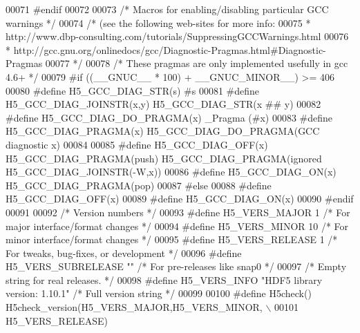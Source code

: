 \begin{DoxyCode}
00071 \textcolor{preprocessor}{#endif}
00072 
00073 \textcolor{comment}{/* Macros for enabling/disabling particular GCC warnings */}
00074 \textcolor{comment}{/* (see the following web-sites for more info:}
00075 \textcolor{comment}{ *      http://www.dbp-consulting.com/tutorials/SuppressingGCCWarnings.html}
00076 \textcolor{comment}{ *      http://gcc.gnu.org/onlinedocs/gcc/Diagnostic-Pragmas.html#Diagnostic-Pragmas}
00077 \textcolor{comment}{ */}
00078 \textcolor{comment}{/* These pragmas are only implemented usefully in gcc 4.6+ */}
00079 \textcolor{preprocessor}{#if ((\_\_GNUC\_\_ * 100) + \_\_GNUC\_MINOR\_\_) >= 406}
00080 \textcolor{preprocessor}{    #define H5\_GCC\_DIAG\_STR(s) #s}
00081 \textcolor{preprocessor}{    #define H5\_GCC\_DIAG\_JOINSTR(x,y) H5\_GCC\_DIAG\_STR(x ## y)}
00082 \textcolor{preprocessor}{    #define H5\_GCC\_DIAG\_DO\_PRAGMA(x) \_Pragma (#x)}
00083 \textcolor{preprocessor}{    #define H5\_GCC\_DIAG\_PRAGMA(x) H5\_GCC\_DIAG\_DO\_PRAGMA(GCC diagnostic x)}
00084 
00085 \textcolor{preprocessor}{    #define H5\_GCC\_DIAG\_OFF(x) H5\_GCC\_DIAG\_PRAGMA(push) H5\_GCC\_DIAG\_PRAGMA(ignored
       H5\_GCC\_DIAG\_JOINSTR(-W,x))}
00086 \textcolor{preprocessor}{    #define H5\_GCC\_DIAG\_ON(x) H5\_GCC\_DIAG\_PRAGMA(pop)}
00087 \textcolor{preprocessor}{#else}
00088 \textcolor{preprocessor}{    #define H5\_GCC\_DIAG\_OFF(x)}
00089 \textcolor{preprocessor}{    #define H5\_GCC\_DIAG\_ON(x)}
00090 \textcolor{preprocessor}{#endif}
00091 
00092 \textcolor{comment}{/* Version numbers */}
00093 \textcolor{preprocessor}{#define H5\_VERS\_MAJOR   1   }\textcolor{comment}{/* For major interface/format changes        */}\textcolor{preprocessor}{}
00094 \textcolor{preprocessor}{#define H5\_VERS\_MINOR   10  }\textcolor{comment}{/* For minor interface/format changes        */}\textcolor{preprocessor}{}
00095 \textcolor{preprocessor}{#define H5\_VERS\_RELEASE 1   }\textcolor{comment}{/* For tweaks, bug-fixes, or development     */}\textcolor{preprocessor}{}
00096 \textcolor{preprocessor}{#define H5\_VERS\_SUBRELEASE ""   }\textcolor{comment}{/* For pre-releases like snap0       */}\textcolor{preprocessor}{}
00097                 \textcolor{comment}{/* Empty string for real releases.           */}
00098 \textcolor{preprocessor}{#define H5\_VERS\_INFO    "HDF5 library version: 1.10.1"      }\textcolor{comment}{/* Full version string */}\textcolor{preprocessor}{}
00099 
00100 \textcolor{preprocessor}{#define H5check()   H5check\_version(H5\_VERS\_MAJOR,H5\_VERS\_MINOR,          \(\backslash\)}
00101 \textcolor{preprocessor}{                        H5\_VERS\_RELEASE)}

\end{DoxyCode}
